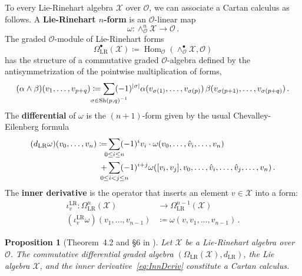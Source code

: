 \documentclass[12pt,reqno, a4paper]{amsart}
\numberwithin{equation}{section}
\theoremstyle{plain}
\newtheorem{Proposition}[Theorem]{Proposition}
\theoremstyle{definition}
\theoremstyle{remark}
\DeclareMathOperator{\Hom}{Hom}
\DeclareMathOperator{\Shuff}{Sh}
\newcommand{\calO}{\mathcal{O}}
\newcommand{\calX}{\mathcal{X}}
\begin{document}
To every Lie-Rinehart algebra $\calX$ over $\calO$, we can associate a Cartan calculus as follows. A \textbf{Lie-Rinehart $n$-form} is an $\calO$-linear map
\begin{equation*}
  \omega: \wedge^n_\calO \calX
  \longrightarrow \calO
  \,.
\end{equation*}
The graded $\calO$-module of Lie-Rinehart forms
\begin{equation}
  \Omega_\mathrm{LR}^\bullet(\calX)
  \coloneqq \Hom_\calO(\wedge^\bullet_\calO \calX, \calO)
\end{equation}
has the structure of a commutative graded $\calO$-algebra defined by the antisymmetrization of the pointwise multiplication of forms,
\begin{equation*}
  (\alpha \wedge \beta)(v_1, \ldots, v_{p+q})
  \coloneqq \sum_{\mathclap{\sigma \in \Shuff(p,q)^{-1}}}
    (-1)^{|\sigma|}
    \alpha(v_{\sigma(1)}, \ldots, v_{\sigma(p)}) \,
    \beta(v_{\sigma(p+1)}, \ldots, v_{\sigma(p+q)})
    \,.
\end{equation*}
The \textbf{differential} of $\omega$ is the $(n+1)$-form given by the usual Chevalley-Eilenberg formula
\begin{equation}
\label{eq:differential}
\begin{split}
  (d_\mathrm{LR}\omega)(v_0, \ldots, v_n)
  \coloneqq &\sum_{\mathclap{0 \leq i \leq n}} (-1)^i
    v_i \cdot \omega(v_0, \ldots, \hat{v}_i, \ldots, v_n)
  \\
    + &\sum_{\mathclap{0 \leq i < j \leq n}}
    (-1)^{i+j} \omega([v_i, v_j], v_0, \ldots, \hat{v}_i, \ldots, \hat{v}_j, \ldots, v_n)
  \,.
\end{split}
\end{equation}
The \textbf{inner derivative} is the operator that inserts an element $v \in \calX$ into a form:
\begin{equation}
\label{eq:InnDeriv}
\begin{aligned}
   \iota^\mathrm{LR}_v: \Omega_\mathrm{LR}^n(\calX)
   &\longrightarrow \Omega_\mathrm{LR}^{n-1}(\calX)
   \\
   (\iota^\mathrm{LR}_v \omega)(v_1, \ldots, v_{n-1})
   &\coloneqq
   \omega(v, v_1, \ldots, v_{n-1})
   \,.
\end{aligned}
\end{equation}

\begin{Proposition}[Theorem~4.2 and \S6 in \cite{Rinehart:1963}]
\label{prop:ACartanCalc}
Let $\calX$ be a Lie-Rinehart algebra over $\calO$. The commutative differential graded algebra $(\Omega_\mathrm{LR}(\calX), d_\mathrm{LR})$, the Lie algebra $\calX$, and the inner derivative~\eqref{eq:InnDeriv} constitute a Cartan calculus.
\end{Proposition}
\end{document}
